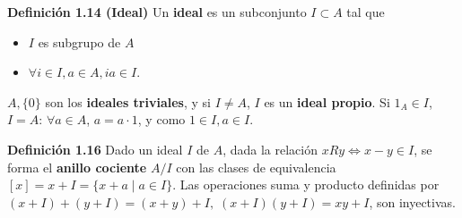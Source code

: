 \documentclass[a4paper, 11pt]{extarticle}
\newcommand{\defi}[1]{\textcolor{azul}{\textbf{Definición #1}}}
\begin{document}
\defi{1.14 (Ideal)} Un \textbf{ideal} es un subconjunto \(I \subset A\) tal que
\begin{itemize}
\item \(I\) es subgrupo de \(A\)
\item \(\forall i \in I, a \in A, ia \in I\).
\end{itemize}
\(A, \{ 0 \}\) son los \textbf{ideales triviales}, y si \(I \neq A\), \(I\) es un  
\textbf{ideal propio}. Si \(1_A \in I\), \(I = A\): \(\forall a \in A\), \(a = a
\cdot 1\), y como \(1 \in I, a \in I\).

\defi{1.16} Dado un ideal \(I\) de \(A\), dada la relación \(xRy \iff x-y
\in I\), se forma el \textbf{anillo cociente} \(A/I\) con las clases de equivalencia
\([x] = x + I = \{ x + a \;|\; a \in I  \}\).
Las operaciones suma y producto definidas por \((x + I) + (y + I) = (x + y) +
I, \; (x + I)(y + I) = xy + I\), son inyectivas.
\end{document}
